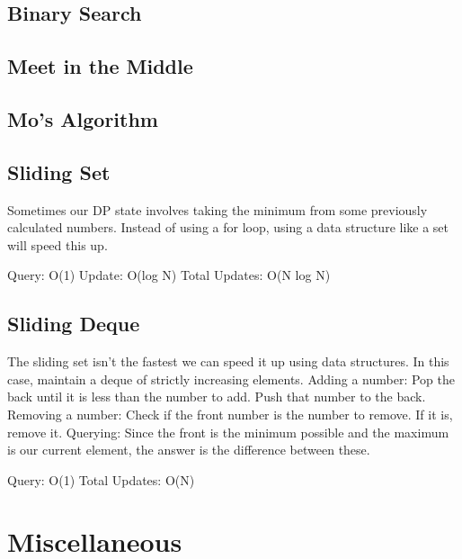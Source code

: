 \documentclass{article}
\begin{document}
\subsection{Binary Search}


\subsection{Meet in the Middle}


\subsection{Mo's Algorithm}


\subsection{Sliding Set}
\begin{flushleft}
Sometimes our DP state involves taking the minimum from some previously
calculated numbers. Instead of using a for loop, using a data structure like a
set will speed this up.

Query: O(1)
Update: O(log N)
Total Updates: O(N log N)
\end{flushleft}



\subsection{Sliding Deque}
\begin{flushleft}
The sliding set isn't the fastest we can speed it up using data structures.
In this case, maintain a deque of strictly increasing elements.
\newline
Adding a number: Pop the back until it is less than the number to add. Push that number to the back.
Removing a number: Check if the front number is the number to remove. If it is, remove it.
Querying: Since the front is the minimum possible and the maximum is our current element, the answer is the difference between these.

Query: O(1)
Total Updates: O(N)
\end{flushleft}


\section{Miscellaneous}
\end{document}
